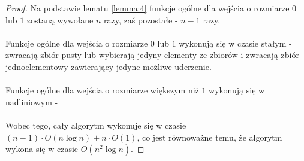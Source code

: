 \documentclass[10pt,a4paper]{article}
\begin{document}
	\begin{proof}
		Na podstawie lematu \ref{lemma:4} funkcje ogólne dla wejścia o rozmiarze $0$ lub $1$ zostaną wywołane $n$ razy, zaś pozostałe - $n - 1$ razy. \\~\\
		Funkcje ogólne dla wejścia o rozmiarze $0$ lub $1$ wykonują się w czasie stałym - zwracają zbiór pusty lub wybierają jedyny elementy ze zbiorów i zwracają zbiór jednoelementowy zawierający jedyne możliwe uderzenie.\\~\\
		Funkcje ogólne dla wejścia o rozmiarze większym niż $1$ wykonują się w nadliniowym - %
		\\~\\
		Wobec tego, cały algorytm wykonuje się w czasie $(n - 1) \cdot O(n \log n) + n \cdot O(1)$, co jest równoważne temu, że algorytm wykona się w czasie $O(n^{2} \log n)$.
	\end{proof}
	
	
\end{document}

